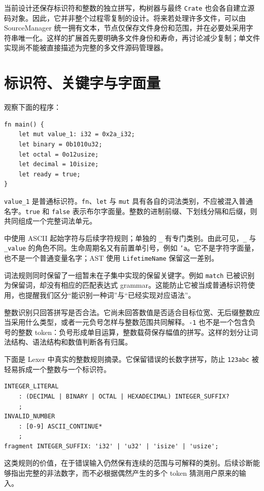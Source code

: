 当前设计还保存标识符和整数的独立拼写，构树器与最终 \texttt{Crate} 也会各自建立源码对象。因此，它并非整个过程零复制的设计。将来若处理许多文件，可以由 SourceManager 统一拥有文本，节点仅保存文件身份和范围，并在必要处采用字符串唯一化。这样的扩展首先要明确多文件身份和寿命，再讨论减少复制；单文件实现尚不能被直接描述为完整的多文件源码管理器。

\section{标识符、关键字与字面量}
观察下面的程序：
\begin{lstlisting}[language=Rustless]
fn main() {
    let mut value_1: i32 = 0x2a_i32;
    let binary = 0b1010u32;
    let octal = 0o12usize;
    let decimal = 10isize;
    let ready = true;
}
\end{lstlisting}
\texttt{value\_1} 是普通标识符。\texttt{fn}、\texttt{let} 与 \texttt{mut} 具有各自的词法类别，不应被混入普通名字。\texttt{true} 和 \texttt{false} 表示布尔字面量。整数的进制前缀、下划线分隔和后缀，则共同组成一个完整词法单元。

 中使用 ASCII 起始字符与后续字符规则；单独的 \texttt{\_} 有专门类别。由此可见，\texttt{\_} 与 \texttt{\_value} 的角色不同。生命周期名又有前置单引号，例如 \texttt{'a}。它不是字符字面量，也不是一个普通变量名字；AST 使用 \texttt{LifetimeName} 保留这一差别。

词法规则同时保留了一组暂未在子集中实现的保留关键字。例如 \texttt{match} 已被识别为保留词，却没有相应的匹配表达式 grammar。这能防止它被当成普通标识符使用，也提醒我们区分“能识别一种词”与“已经实现对应语法”。

整数识别只回答拼写是否合法。它尚未回答数值是否适合目标位宽、无后缀整数应当采用什么类型，或者一元负号怎样与整数范围共同解释。\texttt{-1} 也不是一个包含负号的整数 token：负号形成单目运算，整数载荷保存幅值的拼写。这样的划分让词法结构、语法结构和数值判断各有归属。

下面是 Lexer 中真实的整数规则摘录。它保留错误的长数字拼写，防止 \texttt{123abc} 被轻易拆成一个整数与一个标识符。
\begin{lstlisting}
INTEGER_LITERAL
    : (DECIMAL | BINARY | OCTAL | HEXADECIMAL) INTEGER_SUFFIX?
    ;
INVALID_NUMBER
    : [0-9] ASCII_CONTINUE*
    ;
fragment INTEGER_SUFFIX: 'i32' | 'u32' | 'isize' | 'usize';
\end{lstlisting}
这类规则的价值，在于错误输入仍然保有连续的范围与可解释的类别。后续诊断能够指出完整的非法数字，而不必根据偶然产生的多个 token 猜测用户原来的输入。

